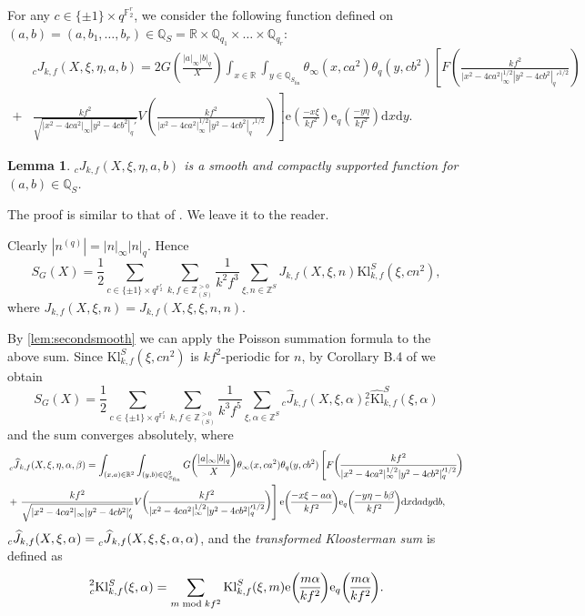 \documentclass[10pt,oneside,reqno]{amsart}
\makeatletter
\newcommand\rmd{\mathrm{d}}
\newcommand\rme{\mathrm{e}}
\newcommand\FF{\mathbb{F}}
\newcommand\QQ{\mathbb{Q}}
\newcommand\RR{\mathbb{R}}
\newcommand\ZZ{\mathbb{Z}}
\newcommand\fin{\mathrm{fin}}
\newcommand\Kl{\mathrm{Kl}}
\newcommand\legendresymbol[2]{\genfrac{(}{)}{}{}{#1}{#2}}
\theoremstyle{THEOREM}
\newtheorem{lemma}[theorem]{Lemma}
\theoremstyle{DEFINITION}
\theoremstyle{EXERCISE}
\numberwithin{equation}{section}
\renewenvironment{proof}[1][\proofname]{\par
  \vspace{-6pt}
  \pushQED{\qed}
  \normalfont \topsep6\p@\@plus6\p@\relax
  \trivlist
  \item[\hskip\labelsep\rmfamily\bfseries
    #1\@addpunct{:}]\ignorespaces
}{
  \popQED\endtrivlist\@endpefalse
  \vspace{-6pt}
}
\makeatother
\begin{document}
For any $c\in \{\pm 1\}\times q^{\FF_2^r}$, we consider the following function defined on $(a,b)=(a,b_1,\dots,b_r)\in \QQ_S=\RR\times \QQ_{q_1}\times\dots\times \QQ_{q_r}$:
\begin{align*}
&{}_cJ_{k,f}(X,\xi,\eta,a,b)=2G\legendresymbol{|a|_\infty|b|_q}{X}\int_{x\in\RR}\int_{y\in\QQ_{S_\fin}} \theta_\infty(x,ca^2)\theta_{q}(y,cb^2)\left[F\legendresymbol{kf^2}{|x^2-4ca^2|_\infty^{1/2}|y^2- 4cb^2|_q'^{1/2}}\right.\\
+&\left.\frac{kf^2}{\sqrt{|x^2-4ca^2|_\infty|y^2- 4cb^2|_q'}}V\legendresymbol{kf^2}{|x^2-4ca^2|_\infty^{1/2}|y^2- 4cb^2|_q'^{1/2}}\right]\rme\legendresymbol{-x\xi}{kf^2}\rme_{q}\legendresymbol{-y\eta}{kf^2}\rmd x\rmd y.
\end{align*}
\begin{lemma}\label{lem:secondsmooth}
${}_cJ_{k,f}(X,\xi,\eta,a,b)$ is a smooth and compactly supported function for $(a,b)\in \QQ_S$.
\end{lemma}
\begin{proof}
The proof is similar to that of \cite[Lemma 3.1]{cheng2025c}. We leave it to the reader.
\end{proof}
Clearly $|n^{(q)}|=|n|_\infty|n|_q$. Hence
\[
S_G(X)=\frac12\sum_{c\in \{\pm 1\}\times q^{\FF_2^r}}\sum_{k,f\in \ZZ_{(S)}^{>0}}\frac{1}{k^2f^3}\sum_{\xi,n\in \ZZ^S}J_{k,f}(X,\xi,n)\Kl_{k,f}^S(\xi,cn^2),
\]
where $J_{k,f}(X,\xi,n)=J_{k,f}(X,\xi,\xi,n,n)$.

By \autoref{lem:secondsmooth} we can apply the Poisson summation formula to the above sum. Since $\Kl_{k,f}^S(\xi,cn^2)$ is $kf^2$-periodic for $n$, by Corollary B.4 of \cite{cheng2025} we obtain
\[
S_G(X)=\frac12\sum_{c\in \{\pm 1\}\times q^{\FF_2^r}}\sum_{k,f\in \ZZ_{(S)}^{>0}}\frac{1}{k^3f^5}\sum_{\xi,\alpha\in \ZZ^S}{}_c\widehat{J}_{k,f}(X,\xi,\alpha){}^2_c\widehat{\Kl}_{k,f}^S(\xi,\alpha)
\]
and the sum converges absolutely, where
\begin{align*}
&\prescript{}{c}{\widehat{J}}_{k,f}(X,\xi,\eta,\alpha,\beta)=\int_{(x,a)\in\RR^2}\int_{(y,b)\in\QQ_{S_\fin}^2}G\legendresymbol{|a|_\infty|b|_q}{X} \theta_\infty(x,ca^2)\theta_{q}(y,cb^2)\left[F\legendresymbol{kf^2}{|x^2-4ca^2|_\infty^{1/2}|y^2- 4cb^2|_q'^{1/2}}\right.\\
&+\left.\frac{kf^2}{\sqrt{|x^2-4ca^2|_\infty|y^2- 4cb^2|_q'}}V\legendresymbol{kf^2}{|x^2-4ca^2|_\infty^{1/2}|y^2- 4cb^2|_q'^{1/2}}\right]\rme\legendresymbol{-x\xi-a\alpha}{kf^2}\rme_{q}\legendresymbol{-y\eta-b\beta}{kf^2}\rmd x\rmd a\rmd y\rmd b,
\end{align*}
$_c\widehat{J}_{k,f}(X,\xi,\alpha)=\prescript{}{c}{\widehat{J}}_{k,f}(X,\xi,\xi,\alpha,\alpha)$, and the \emph{transformed Kloosterman sum} is defined as
\begin{equation}\label{eq:transformedkloosterman}
\prescript{2}{c}{\Kl}_{k,f}^S(\xi,\alpha)=\sum_{m\bmod kf^2}\Kl_{k,f}^S(\xi,m)\rme\legendresymbol{m\alpha}{kf^2}\rme_q\legendresymbol{m\alpha}{kf^2}.
\end{equation}
\end{document}
